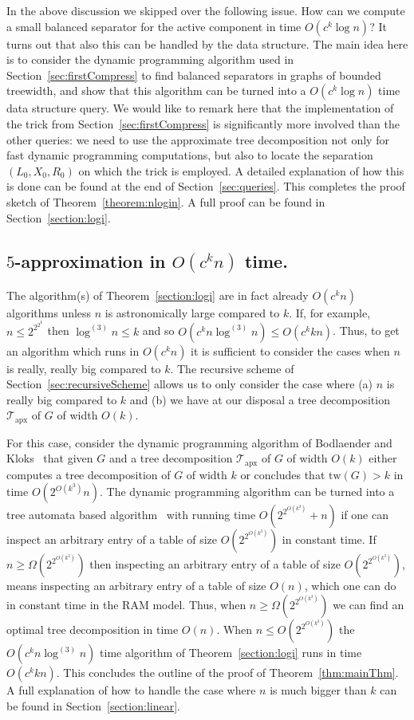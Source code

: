 \documentclass[a4paper,11pt]{article}
\theoremstyle{definition}
\theoremstyle{remark}
\newcommand{\td}{\mathcal{T}} \newcommand{\tw}{\mathrm{tw}} \newcommand{\w}{\mathrm{w}}
\newcommand{\apx}{\textrm{apx}}
\begin{document}
In the above discussion we skipped over the following issue.  How can
we compute a small balanced separator for the active component in time
$O(c^k \log n)$? It turns out that also this can be handled by the
data structure.  The main idea here is to consider the dynamic
programming algorithm used in Section~\ref{sec:firstCompress} to find
balanced separators in graphs of bounded treewidth, and show that this
algorithm can be turned into a $O(c^k \log n)$ time data structure
query.  We would like to remark here that the implementation of the
trick from Section~\ref{sec:firstCompress} is significantly more
involved than the other queries: we need to use the approximate tree
decomposition not only for fast dynamic programming computations, but
also to locate the separation $(L_0,X_0,R_0)$ on which the trick is
employed.  A detailed explanation of how this is done can be found at
the end of Section~\ref{sec:queries}.  This completes the proof sketch
of Theorem~\ref{theorem:nlogin}.  A full proof can be found in
Section~\ref{section:logi}.

\subsection{$5$-approximation in $O(c^kn)$ time.}
The algorithm(s) of Theorem~\ref{section:logi} are in fact already
$O(c^kn)$ algorithms unless $n$ is astronomically large compared to
$k$.  If, for example, $n \leq 2^{2^{2^k}}$ then $\log^{(3)}n \leq k$
and so $O(c^kn \log^{(3)}n) \leq O(c^kkn)$.  Thus, to get an algorithm
which runs in $O(c^kn)$ it is sufficient to consider the cases when
$n$ is really, really big compared to $k$.  The recursive scheme of
Section~\ref{sec:recursiveScheme} allows us to only consider the case
where (a) $n$ is really big compared to $k$ and (b) we have at our
disposal a tree decomposition $\td_\apx$ of $G$ of width $O(k)$.

For this case, consider the dynamic programming algorithm of
Bodlaender and Kloks~\cite{BodlaenderK96} that given $G$ and a tree
decomposition $\td_\apx$ of $G$ of width $O(k)$ either computes a tree
decomposition of $G$ of width $k$ or concludes that $\tw(G) > k$ in
time $O(2^{O(k^3)}n)$.  The dynamic programming algorithm can be
turned into a tree automata based
algorithm~\cite{FellowsL89,AbrahamsonF93} with running time
$O(2^{2^{O(k^3)}} + n)$ if one can inspect an arbitrary entry of a
table of size $O(2^{2^{O(k^3)}})$ in constant time.  If $n \geq
\Omega(2^{2^{O(k^3)}})$ then inspecting an arbitrary entry of a table
of size $O(2^{2^{O(k^3)}})$, means inspecting an arbitrary entry of a
table of size $O(n)$, which one can do in constant time in the RAM
model.  Thus, when $n \geq \Omega(2^{2^{O(k^3)}})$ we can find an
optimal tree decomposition in time $O(n)$.  When $n \leq
O(2^{2^{O(k^3)}})$ the $O(c^kn \log^{(3)}n)$ time algorithm of
Theorem~\ref{section:logi} runs in time $O(c^kkn)$.  This concludes
the outline of the proof of Theorem~\ref{thm:mainThm}.  A full
explanation of how to handle the case where $n$ is much bigger than
$k$ can be found in Section~\ref{section:linear}.
\end{document}
